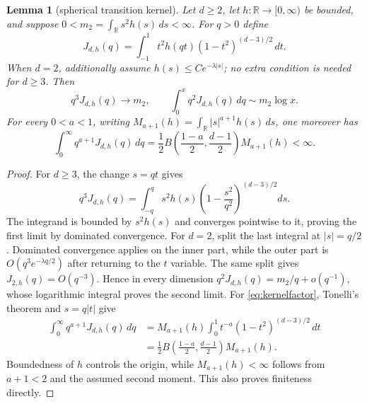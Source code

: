 \documentclass[11pt]{article}
\newtheorem{lemma}[theorem]{Lemma}
\newcommand{\R}{\mathbb R}
\begin{document}
\begin{lemma}[spherical transition kernel]
\label{lem:transitionkernel}
Let $d\ge2$, let $h:\R\to[0,\infty)$ be bounded, and suppose
$0<m_2=\int_\R s^2h(s)\,ds<\infty$.  For $q>0$ define
\[
 J_{d,h}(q)=\int_{-1}^1t^2h(qt)(1-t^2)^{(d-3)/2}\,dt.
\]
When $d=2$, additionally assume $h(s)\le Ce^{-\lambda|s|}$; no extra condition is needed for $d\ge3$.  Then
\begin{equation}
 q^3J_{d,h}(q)\longrightarrow m_2,
 \qquad
 \int_0^xq^2J_{d,h}(q)\,dq\sim m_2\log x.
 \label{eq:kernellimits}
\end{equation}
For every $0<a<1$, writing $M_{a+1}(h)=\int_\R|s|^{a+1}h(s)\,ds$, one moreover has
\begin{equation}
 \int_0^\infty q^{a+1}J_{d,h}(q)\,dq
 =\frac12B\!\left(\frac{1-a}{2},\frac{d-1}{2}\right)M_{a+1}(h)<\infty.
 \label{eq:kernelfactor}
\end{equation}
\end{lemma}

\begin{proof}
For $d\ge3$, the change $s=qt$ gives
\[
 q^3J_{d,h}(q)=\int_{-q}^q s^2h(s)
 \left(1-\frac{s^2}{q^2}\right)^{(d-3)/2}ds.
\]
The integrand is bounded by $s^2h(s)$ and converges pointwise to it, proving the first limit by dominated
convergence.  For $d=2$, split the last integral at $|s|=q/2$.  Dominated convergence applies on the inner
part, while the outer part is $O(q^3e^{-\lambda q/2})$ after returning to the $t$ variable.  The same split gives
$J_{2,h}(q)=O(q^{-3})$.  Hence in every dimension $q^2J_{d,h}(q)=m_2/q+o(q^{-1})$, whose logarithmic integral proves the second limit.
For \eqref{eq:kernelfactor}, Tonelli's theorem and $s=q|t|$ give
\begin{align*}
 \int_0^\infty q^{a+1}J_{d,h}(q)\,dq
 &=M_{a+1}(h)\int_0^1t^{-a}(1-t^2)^{(d-3)/2}\,dt\\
 &=\frac12B\!\left(\frac{1-a}{2},\frac{d-1}{2}\right)M_{a+1}(h).
\end{align*}
Boundedness of $h$ controls the origin, while $M_{a+1}(h)<\infty$ follows from $a+1<2$ and the assumed
second moment.  This also proves finiteness directly.
\end{proof}
\end{document}
